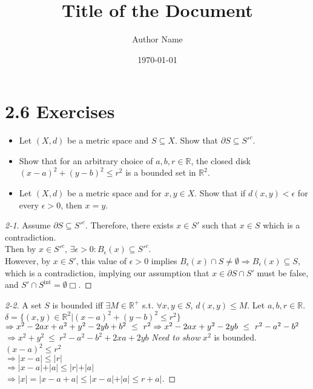 \documentclass{article}
\title{\textbf{Title of the Document}}
\author{Author Name}
\date{\today}
\theoremstyle{definition}
\numberwithin{equation}{section}
\begin{document}
\maketitle
\tableofcontents
\newpage
\section*{2.6 Exercises}
\begin{itemize}
    \item[2-1.] Let $(X,d)$ be a metric space and $S \subseteq X$. Show that $\partial S \subseteq S'^c$.
    \item[2-2.] Show that for an arbitrary choice of $a,b,r \in \mathbb{R}$, the closed disk $(x-a)^2 + (y-b)^2 \leq r^2$ is a bounded set in $\mathbb{R}^2$.
    \item[2-3.] Let $(X,d)$ be a metric space and for $x,y \in X$. Show that if $d(x,y) < \epsilon$ for every $\epsilon > 0$, then $x = y$.
\end{itemize}

\begin{proof}[2-1]
Assume $\partial S \subseteq S'^c$. Therefore, there exists $x \in S'$ such that $x \in S$ which is a contradiction.\\
Then by $x \in S'^c$, $\exists \epsilon > 0 : B_\epsilon(x) \subseteq S'^c$.\\
However, by $x \in S'$, this value of $\epsilon > 0$ implies $B_\epsilon(x) \cap S \neq \emptyset \Rightarrow B_\epsilon(x) \subseteq S$, which is a contradiction, implying our assumption that $x \in \partial S \cap S'$ must be false, and $S' \cap S^{\text{int}}\!=\!\emptyset\!\Box$.
\end{proof}

\begin{proof}[2-2]
A set $S$ is bounded iff $\exists M \in \mathbb{R}^+$ s.t. $\forall x,y \in S$, $d(x,y) \leq M$. Let $a,b,r \in \mathbb{R}$.\\
$\delta = \{(x,y) \in \mathbb{R}^2| (x-a)^2 + (y-b)^2 \leq r^2 \}$
$
\Rightarrow x^2 - 2ax + a^2 + y^2 - 2yb + b^2 \ \leq \ r^2 \\
\Rightarrow x^2 - 2ax + y^2 - 2yb \ \leq \ r^2 - a^2 - b^2
$
$
\Rightarrow x^2 + y^2 \ \leq \ r^2 - a^2 - b^2 + 2xa + 2yb
$
\emph{Need to show} $x^2$ is bounded.\\
$(x-a)^2 \leq r^2$\\
$\Rightarrow \vert x - a \vert \leq \vert r \vert$\\
$\Rightarrow \vert x - a \vert + \vert a \vert \leq \vert r \vert + \vert a \vert$\\
$\Rightarrow \vert x \vert = \vert x - a + a \vert \leq \vert x - a \vert + \vert a \vert \leq r + a \vert$.
\end{proof}
\end{document}
